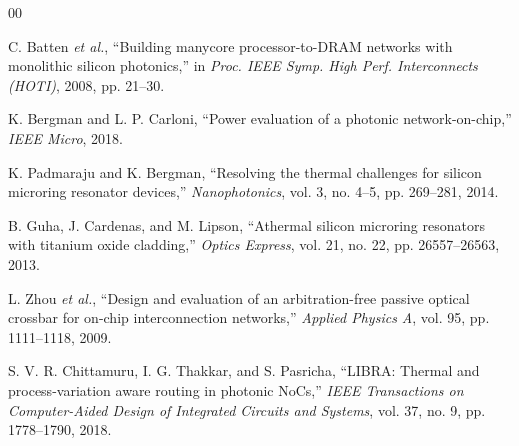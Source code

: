 \documentclass[conference]{IEEEtran}
\begin{document}
\begin{thebibliography}{00}

C. Batten \emph{et al.},
``Building manycore processor-to-DRAM networks with monolithic silicon photonics,''
in \emph{Proc. IEEE Symp. High Perf. Interconnects (HOTI)}, 2008, pp. 21--30.

K. Bergman and L. P. Carloni,
``Power evaluation of a photonic network-on-chip,''
\emph{IEEE Micro}, 2018.

K. Padmaraju and K. Bergman,
``Resolving the thermal challenges for silicon microring resonator devices,''
\emph{Nanophotonics}, vol. 3, no. 4--5, pp. 269--281, 2014.

B. Guha, J. Cardenas, and M. Lipson,
``Athermal silicon microring resonators with titanium oxide cladding,''
\emph{Optics Express}, vol. 21, no. 22, pp. 26557--26563, 2013.

L. Zhou \emph{et al.},
``Design and evaluation of an arbitration-free passive optical crossbar for on-chip interconnection networks,''
\emph{Applied Physics A}, vol. 95, pp. 1111--1118, 2009.

S. V. R. Chittamuru, I. G. Thakkar, and S. Pasricha,
``LIBRA: Thermal and process-variation aware routing in photonic NoCs,''
\emph{IEEE Transactions on Computer-Aided Design of Integrated Circuits and Systems}, vol. 37, no. 9, pp. 1778--1790, 2018.

\end{thebibliography}
\end{document}

